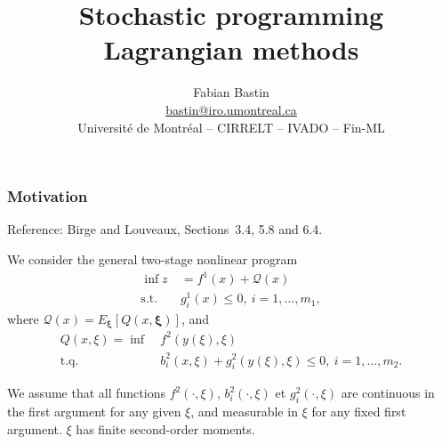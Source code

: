 \documentclass[french]{beamer}
\title[Stochastic Lagrangian]{Stochastic programming\\Lagrangian methods}
\author[Fabian Bastin]{Fabian Bastin \\ \url{bastin@iro.umontreal.ca} \\ Université de Montréal -- CIRRELT -- IVADO -- Fin-ML}
\date{}
\def\bxi{\boldsymbol\xi}
\begin{document}
\frame{\titlepage}

\begin{frame}
\frametitle{Motivation}

{\red Reference}: Birge and Louveaux, Sections~3.4, 5.8 and 6.4.

\mbox{}

We consider the general {\blue two-stage nonlinear program}
\begin{align*}
\inf z\ &= f^1(x) + \mathcal{Q}(x) \\
\mbox{s.t. } & g_i^1(x) \leq 0,\ i = 1,\ldots,m_1,
\end{align*}
where $\mathcal{Q}(x) = E_{\bxi}[Q(x,\bxi)]$, and
\begin{align*}
Q(x,\xi) = \inf\ & f^2(y(\xi),\xi) \\
\mbox{t.q. } & b_i^2(x,\xi) + g_i^2(y(\xi), \xi) \leq 0,\ i = 1,\ldots,m_2.
\end{align*}

We assume that all functions $f^2(\cdot,\xi)$, $b_i^2(\cdot,\xi)$ et $g_i^2(\cdot,\xi)$ are continuous in the first argument for any given $\xi$, and measurable in $\xi$ for any fixed first argument. $\xi$ has finite second-order moments.

\end{frame}



\end{document}
